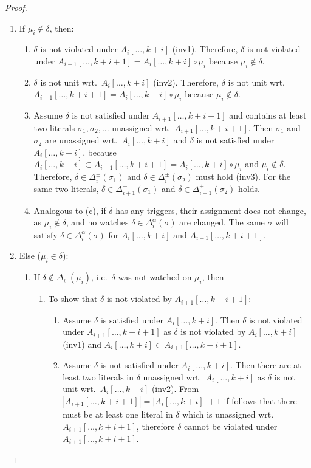 \documentclass{vutinfth} %
\theoremstyle{example}
\theoremstyle{definition}
\theoremstyle{theorem}
\theoremstyle{lemma}
\theoremstyle{corollary}
\newcommand{\ass}{A}
\newcommand{\fabef}{\ass_{i}}
\newcommand{\faaf}{\ass_{i + 1}}
\newcommand{\abef}{\fabef[\ldots, k + i]}
\newcommand{\aaf}{\faaf[\ldots, k + i + 1]}
\newcommand{\dbef}{\Delta_{i}}
\newcommand{\daf}{\Delta_{i+1}}
\newcommand{\sgl}{\mu}
\newcommand{\bsgl}{\sigma}
\begin{document}
\begin{proof}
\begin{enumerate}
\item If $\sgl_i \not \in \delta$, then: %
\begin{enumerate}
\item $\delta$ is not violated under $\abef$ (inv1). Therefore, $\delta$ is not violated under $\aaf = \abef \circ \sgl_i$ because $\sgl_i \not \in \delta$.
\item $\delta$ is not unit wrt.~$\abef$ (inv2). Therefore, $\delta$ is not unit wrt.~$\aaf = \abef \circ \sgl_i$ because $\sgl_i \not \in \delta$.
\item Assume $\delta$ is not satisfied under $\aaf$ and contains at least two literals $\bsgl_1, \bsgl_2, \ldots$ unassigned wrt.~$\aaf$. Then $\bsgl_1$ and $\bsgl_2$ are unassigned wrt.~$\abef$ and $\delta$ is not satisfied under $\abef$, because $\abef \subset \aaf = \abef \circ \sgl_i$ and $\sgl_i \not \in \delta$. Therefore, $\delta \in \dbef^\pm(\bsgl_1)$ and $\delta \in \dbef^\pm(\bsgl_2)$ must hold (inv3). For the same two literals, $\delta \in \daf^\pm(\bsgl_1)$ and $\delta \in \daf^\pm(\bsgl_2)$ holds. %
\item Analogous to (c), if $\delta$ has any triggers, their assignment does not change, as $\sgl_i \not \in \delta$, and no watches $\delta \in \dbef^\alpha(\bsgl)$ are changed. The same $\bsgl$ will satisfy $\delta \in \dbef^\alpha(\bsgl)$ for $\abef$ and $\aaf$.
\end{enumerate}
\item Else ($\sgl_i \in \delta$):
\begin{enumerate}
\item If $\delta \not \in \dbef^\pm(\sgl_i)$, i.e.~$\delta$ was not watched on $\sgl_i$, then
\begin{enumerate}
\item To show that $\delta$ is not violated by $\aaf$:
\begin{enumerate}
\item Assume $\delta$ is satisfied under $\abef$. Then $\delta$ is not violated under $\aaf$ as $\delta$ is not violated by $\abef$ (inv1) and $\abef \subset \aaf$.
\item Assume $\delta$ is not satisfied under $\abef$. Then there are at least two literals in $\delta$ unassigned wrt.~$\abef$ as $\delta$ is not unit wrt.~$\abef$ (inv2). From $|\aaf| = |\abef| + 1$ if follows that there must be at least one literal in $\delta$ which is unassigned wrt.~$\aaf$, therefore $\delta$ cannot be violated under $\aaf$.

\end{enumerate}
\end{enumerate}
\end{enumerate}
\end{enumerate}
\end{proof}
\end{document}
